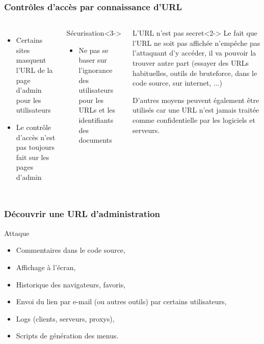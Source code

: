 \documentclass[aspectratio=169]{beamer}  %
\begin{document}
\begin{frame}
  \frametitle{Contrôles d'accès par connaissance d'URL}
  \begin{columns}[c]
      \begin{itemize}[<1->]
        \item Certains sites masquent l'URL de la page d'admin pour les utilisateurs
        \item Le contrôle d'accès n'est pas toujours fait sur les pages d'admin
      \end{itemize}
      \begin{exampleblock}{Sécurisation}<3->
        \begin{itemize}
          \item Ne pas se baser sur l'ignorance des utilisateurs pour les URLs et les identifiants des documents
        \end{itemize}
      \end{exampleblock}
      \begin{block}{L'URL n'est pas secret}<2->
        Le fait que l'URL ne soit pas affichée n'empêche pas l'attaquant d'y accéder, il va pouvoir la trouver autre part (essayer des URLs habituelles, outils de bruteforce, dans le code source, sur internet, ...)
        
        D'autres moyens peuvent également être utilisés car une URL n'est jamais traitée comme confidentielle par les logiciels et serveurs.
      \end{block}
  \end{columns}
\end{frame}

\begin{frame}
  \frametitle{Découvrir une URL d'administration}
  \begin{alertblock}{Attaque}
    \begin{itemize}
      \item Commentaires dans le code source,
      \item Affichage à l'écran, 
      \item Historique des navigateurs, favoris,
      \item Envoi du lien par e-mail (ou autres outils) par certains utilisateurs,
      \item Logs (clients, serveurs, proxys), 
      \item Scripts de génération des menus.
    \end{itemize}
  \end{alertblock}
\end{frame}
\end{document}
